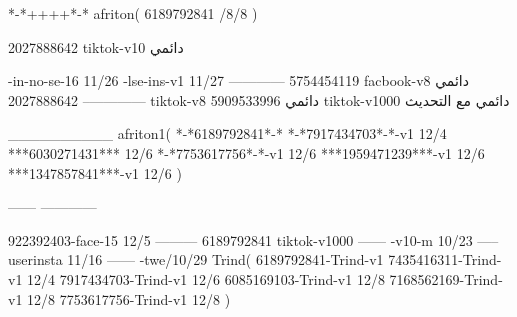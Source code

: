 *-*++++*-*
afriton(
6189792841 /8/8
)

2027888642 tiktok-v10
دائمي

-in-no-se-16 11/26
-lse-ins-v1 11/27
------------
5754454119 facbook-v8
دائمي
--------------
2027888642 tiktok-v8
دائمي
5909533996 tiktok-v1000
دائمي مع التحديث

__________
afriton1(
*-*6189792841*-*
*-*7917434703*-*-v1 12/4
***6030271431*** 12/6
*-*7753617756*-*-v1 12/6
***1959471239***-v1 12/6
***1347857841***-v1 12/6
)

------
------------


922392403-face-15 12/5
---------
6189792841 tiktok-v1000
------
-v10-m 10/23
-----
userinsta 11/16
------
-twe/10/29
Trind(
6189792841-Trind-v1 
7435416311-Trind-v1 12/4
7917434703-Trind-v1 12/6
6085169103-Trind-v1 12/8
7168562169-Trind-v1 12/8
7753617756-Trind-v1 12/8
)
